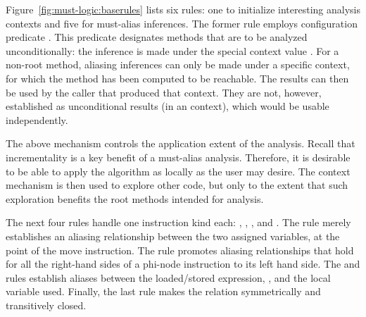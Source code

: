 Figure~\ref{fig:must-logic:baserules} lists six rules: one to initialize interesting analysis contexts and five for must-alias inferences. The former rule employs configuration predicate . This predicate designates methods that are to be analyzed unconditionally: the inference is made under the special context value \dlAll{}. For a non-root method, aliasing inferences can only be made under a specific context, for which the method has been computed to be reachable. The results can then be used by the caller that produced that context. They are not, however, established as unconditional results (in an \dlAll{} context), which would be usable independently.

The above mechanism controls the application extent of the analysis. Recall that incrementality is a key benefit of a must-alias analysis. Therefore, it is desirable to be able to apply the algorithm as locally as the user may desire. The context mechanism is then used to explore other code, but only to the extent that such exploration benefits the root methods intended for analysis.

The next four  rules handle one instruction kind each: , , , and . The  rule merely establishes an aliasing relationship between the two assigned variables, at the point of the move instruction. The  rule promotes aliasing relationships that hold for all the right-hand sides of a phi-node instruction to its left hand side. The  and  rules establish aliases between the loaded/stored expression, , and the local variable used. Finally, the last  rule makes the  relation symmetrically and transitively closed.

